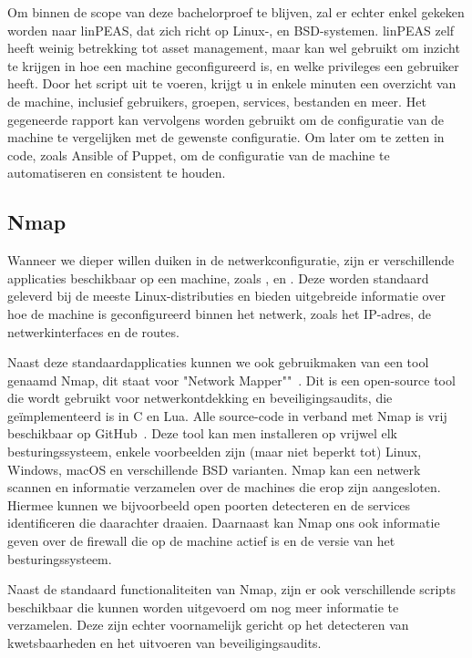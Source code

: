 Om binnen de scope van deze bachelorproef te blijven, zal er echter enkel gekeken worden naar linPEAS, dat zich richt op Linux-, en BSD-systemen.
linPEAS zelf heeft weinig betrekking tot asset management, maar kan wel gebruikt om inzicht te krijgen in hoe een machine geconfigureerd is, en welke privileges een gebruiker heeft.
Door het script uit te voeren, krijgt u in enkele minuten een overzicht van de machine, inclusief gebruikers, groepen, services, bestanden en meer.
Het gegeneerde rapport kan vervolgens worden gebruikt om de configuratie van de machine te vergelijken met de gewenste configuratie.
Om later om te zetten in code, zoals Ansible of Puppet, om de configuratie van de machine te automatiseren en consistent te houden.

\subsection{Nmap}
\label{sub:nmap}

Wanneer we dieper willen duiken in de netwerkconfiguratie, zijn er verschillende applicaties beschikbaar op een machine, zoals ,  en .
Deze worden standaard geleverd bij de meeste Linux-distributies en bieden uitgebreide informatie over hoe de machine is geconfigureerd binnen het netwerk, zoals het IP-adres, de netwerkinterfaces en de routes.

Naast deze standaardapplicaties kunnen we ook gebruikmaken van een tool genaamd Nmap, dit staat voor "Network Mapper""~\autocite{nmap-website}.
Dit is een open-source tool die wordt gebruikt voor netwerkontdekking en beveiligingsaudits, die ge\"implementeerd is in C en Lua.
Alle source-code in verband met Nmap is vrij beschikbaar op GitHub~\autocite{nmap-github}.
Deze tool kan men installeren op vrijwel elk besturingssysteem, enkele voorbeelden zijn (maar niet beperkt tot) Linux, Windows, macOS en verschillende BSD varianten.
Nmap kan een netwerk scannen en informatie verzamelen over de machines die erop zijn aangesloten.
Hiermee kunnen we bijvoorbeeld open poorten detecteren en de services identificeren die daarachter draaien.
Daarnaast kan Nmap ons ook informatie geven over de firewall die op de machine actief is en de versie van het besturingssysteem.

Naast de standaard functionaliteiten van Nmap, zijn er ook verschillende scripts beschikbaar die kunnen worden uitgevoerd om nog meer informatie te verzamelen.
Deze zijn echter voornamelijk gericht op het detecteren van kwetsbaarheden en het uitvoeren van beveiligingsaudits.

